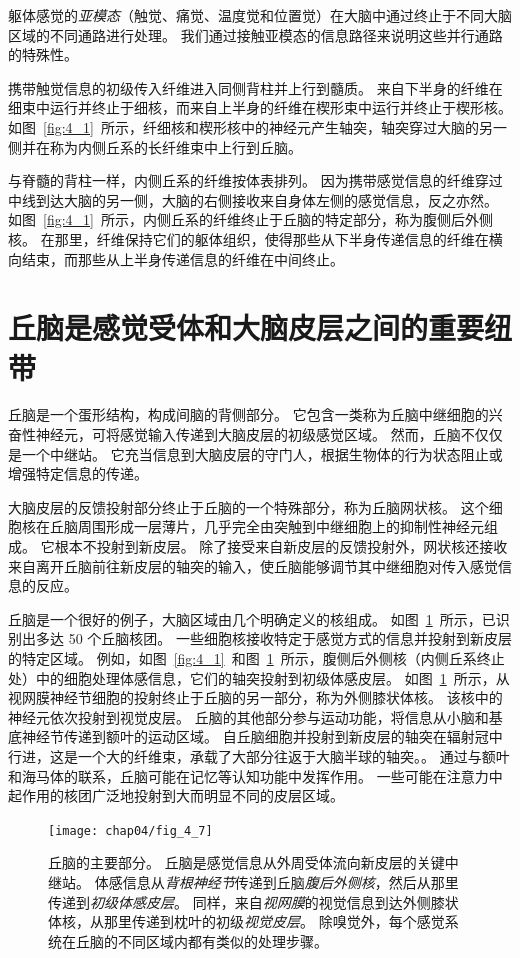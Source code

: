 躯体感觉的\textit{亚模态}（触觉、痛觉、温度觉和位置觉）在大脑中通过终止于不同大脑区域的不同通路进行处理。
我们通过接触亚模态的信息路径来说明这些并行通路的特殊性。


携带触觉信息的初级传入纤维进入同侧背柱并上行到髓质。
来自下半身的纤维在细束中运行并终止于细核，而来自上半身的纤维在楔形束中运行并终止于楔形核。 
如图~\ref{fig:4_1}~所示，纤细核和楔形核中的神经元产生轴突，轴突穿过大脑的另一侧并在称为内侧丘系的长纤维束中上行到丘脑。


与脊髓的背柱一样，内侧丘系的纤维按体表排列。
因为携带感觉信息的纤维穿过中线到达大脑的另一侧，大脑的右侧接收来自身体左侧的感觉信息，反之亦然。 
如图~\ref{fig:4_1}~所示，内侧丘系的纤维终止于丘脑的特定部分，称为腹侧后外侧核。 
在那里，纤维保持它们的躯体组织，使得那些从下半身传递信息的纤维在横向结束，而那些从上半身传递信息的纤维在中间终止。



\section{丘脑是感觉受体和大脑皮层之间的重要纽带}

丘脑是一个蛋形结构，构成间脑的背侧部分。 
它包含一类称为丘脑中继细胞的兴奋性神经元，可将感觉输入传递到大脑皮层的初级感觉区域。 
然而，丘脑不仅仅是一个中继站。 
它充当信息到大脑皮层的守门人，根据生物体的行为状态阻止或增强特定信息的传递。


大脑皮层的反馈投射部分终止于丘脑的一个特殊部分，称为丘脑网状核。 
这个细胞核在丘脑周围形成一层薄片，几乎完全由突触到中继细胞上的抑制性神经元组成。 
它根本不投射到新皮层。 
除了接受来自新皮层的反馈投射外，网状核还接收来自离开丘脑前往新皮层的轴突的输入，使丘脑能够调节其中继细胞对传入感觉信息的反应。


丘脑是一个很好的例子，大脑区域由几个明确定义的核组成。
如图~\ref{fig:4_7}~所示，已识别出多达 50 个丘脑核团。
一些细胞核接收特定于感觉方式的信息并投射到新皮层的特定区域。
例如，如图~\ref{fig:4_1}~和图~\ref{fig:4_7}~所示，腹侧后外侧核（内侧丘系终止处）中的细胞处理体感信息，它们的轴突投射到初级体感皮层。 
如图~\ref{fig:4_7}~所示，从视网膜神经节细胞的投射终止于丘脑的另一部分，称为外侧膝状体核。 
该核中的神经元依次投射到视觉皮层。 
丘脑的其他部分参与运动功能，将信息从小脑和基底神经节传递到额叶的运动区域。 
自丘脑细胞并投射到新皮层的轴突在辐射冠中行进，这是一个大的纤维束，承载了大部分往返于大脑半球的轴突。。 
通过与额叶和海马体的联系，丘脑可能在记忆等认知功能中发挥作用。 
一些可能在注意力中起作用的核团广泛地投射到大而明显不同的皮层区域。


\begin{figure}[htbp]
	\centering
	\texttt{[image: chap04/fig\_4\_7]}
	\caption{丘脑的主要部分。
		丘脑是感觉信息从外周受体流向新皮层的关键中继站。
		体感信息从\textit{背根神经节}传递到丘脑\textit{腹后外侧核}，然后从那里传递到\textit{初级体感皮层}。
		同样，来自\textit{视网膜}的视觉信息到达外侧膝状体核，从那里传递到枕叶的初级\textit{视觉皮层}。
		除嗅觉外，每个感觉系统在丘脑的不同区域内都有类似的处理步骤。}
	\label{fig:4_7}
\end{figure}


